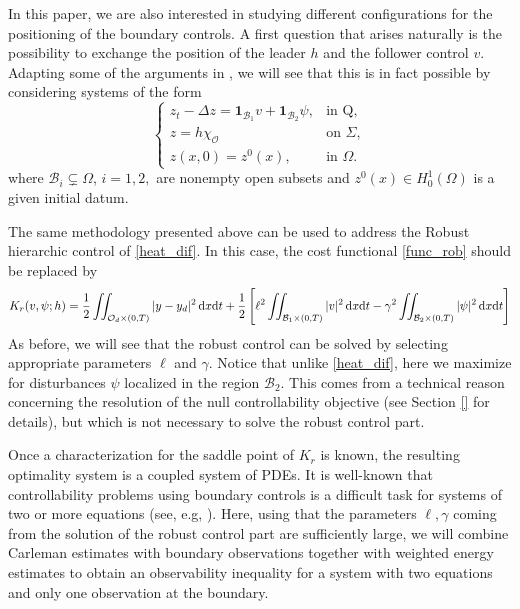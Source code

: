 \documentclass[preprint,10pt]{article}
\numberwithin{equation}{section}
\numberwithin{theorem}{section}
\def\dx{\,\textnormal{d}x}
\def\dt{\textnormal{d}t}
\def\csbd{\chi_{\mathcal O}}
\newcommand\csin[1]{\mathbf1_{#1}}
\def\dx{\,\textnormal{d}x}
\def\dt{\textnormal{d}t}
\newcommand\magenta[1]{{\color{magenta} #1}}
\begin{document}
{In this paper, we are also interested in studying different configurations for the positioning of the boundary controls. A first question that arises naturally is the possibility to exchange the position of the leader $h$ and the follower control $v$. Adapting some of the arguments in \cite{da_silva}, we will see that this is in fact possible by considering systems of the form 
%
\begin{equation}\label{heat_dif}
\begin{cases}
z_t-\Delta z=\csin{\mathcal B_1}v+\csin{\mathcal B_2}\psi, & \text{in Q}, \\
z=h\csbd &\text{on } \Sigma, \\
z(x,0)=z^0(x), & \text{in } \Omega.
\end{cases}
\end{equation}
%
where \magenta{$\mathcal B_i \subsetneq \Omega$}, $i=1,2,$ are nonempty open subsets and $z^0(x)\in H_0^1(\Omega)$ is a given initial datum. 

The same methodology presented above can be used to address the Robust hierarchic control of \eqref{heat_dif}. In this case, the cost functional \eqref{func_rob} should be replaced by 
%
\begin{equation}\label{func_rob_dif}
K_r(v,\psi;h)=\frac{1}{2}\iint_{\mathcal O_d\times(0,T)}|y-y_d|^2\dx\dt+\frac{1}{2}\left[\ell^2\iint_{\mathcal B_1\times(0,T)}|v|^2\dx\dt-\gamma^2\iint_{\mathcal B_2\times(0,T)}|\psi|^2\dx\dt\right]
\end{equation}
%
As before, we will see that the robust control can be solved by selecting appropriate parameters $\ell$ and $\gamma$. Notice that unlike \eqref{heat_dif}, here we maximize for disturbances $\psi$ localized in the region $\mathcal B_2$. This comes from a technical reason concerning the resolution of the null controllability objective (see Section \ref{} for details), but which is not necessary to solve the robust control part. 

Once a characterization for the saddle point of $K_r$ is known, the resulting optimality system is a coupled system of PDEs. It is well-known that controllability problems using boundary controls is a difficult task for systems of two or more equations (see, e.g, \cite{assia_survey,assia_luz_new}). Here, using that the parameters $\ell,\gamma$ coming from the solution of the robust control part are sufficiently large, we will combine Carleman estimates with boundary observations together with weighted energy estimates to obtain an observability inequality for a system with two equations and only one observation at the boundary.

}
\end{document}
